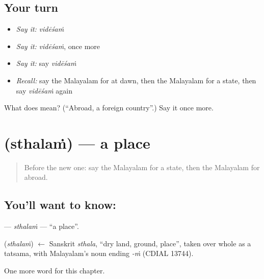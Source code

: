\subsection*{Your turn}
\begin{itemize}
\raggedright
  \item \emph{Say it:} \emph{vidēśaṁ}
  \item \emph{Say it:} \emph{vidēśaṁ}, once more
  \item \emph{Say it:} say \emph{vidēśaṁ}
  \item \emph{Recall:} say the Malayalam for at dawn, then the Malayalam for a state, then say \emph{vidēśaṁ} again
\end{itemize}

\begin{tcolorbox}[breakable,colback=teal!4,colframe=teal!35!black,title={Before you move on}]
What does  mean? (\textquotedblleft{}Abroad, a foreign country\textquotedblright{}.) Say it once more.
\end{tcolorbox}
\section[\texorpdfstring{\ml{സ്ഥലം} (sthalaṁ)}{സ്ഥലം (sthalaṁ)}]{ (sthalaṁ) — a place}

\label{lesson:ML-C315-sthalam}



\begin{quote}
Before the new one: say the Malayalam for a state, then the Malayalam for abroad.
\end{quote}

\subsection*{You'll want to know: }
\textbf{} — \emph{sthalaṁ} — \textquotedblleft{}a place\textquotedblright{}.

\begin{cousinweb}
\textbf{} (\emph{sthalaṁ}) $\leftarrow$ Sanskrit \emph{sthala}, \textquotedblleft{}dry land, ground, place\textquotedblright{}, taken over whole as a tatsama, with Malayalam's noun ending \emph{-ṁ} (CDIAL 13744).
\end{cousinweb}

\begin{grammarlens}[title={What you've built}]
One more word for this chapter.
\end{grammarlens}

